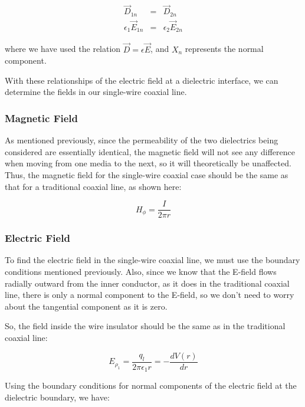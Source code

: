 \documentclass[12pt,onecolumn,titlepage]{article}
\begin{document}
\begin{eqnarray}
\vec{D}_{1n} &=& \vec{D}_{2n} \\
\epsilon_1 \vec{E}_{1n} &=& \epsilon_2 \vec{E}_{2n}
\end{eqnarray}

where we have used the relation $\vec{D} = \epsilon \vec{E}$, and $X_n$ represents the normal component.

With these relationships of the electric field at a dielectric interface, we can determine the fields in our single-wire coaxial line.


\subsubsection{Magnetic Field}
\indent \indent As mentioned previously, since the permeability of the two dielectrics being considered are essentially identical, the magnetic field will not see any difference when moving from one media to the next, so it will theoretically be unaffected. Thus, the magnetic field for the single-wire coaxial case should be the same as that for a traditional coaxial line, as shown here:

\[ H_{\phi} = \frac{I}{2 \pi r} \]


\subsubsection{Electric Field}
\indent \indent To find the electric field in the single-wire coaxial line, we must use the boundary conditions mentioned previously. Also, since we know that the E-field flows radially outward from the inner conductor, as it does in the traditional coaxial line, there is only a normal component to the E-field, so we don't need to worry about the tangential component as it is zero.

So, the field inside the wire insulator should be the same as in the traditional coaxial line:

\[ E_{\rho_1} = \frac{q_l}{2 \pi \epsilon_1 r} = - \frac{dV(r)}{dr} \]

Using the boundary conditions for normal components of the electric field at the dielectric boundary, we have:








\clearpage
\end{document}
